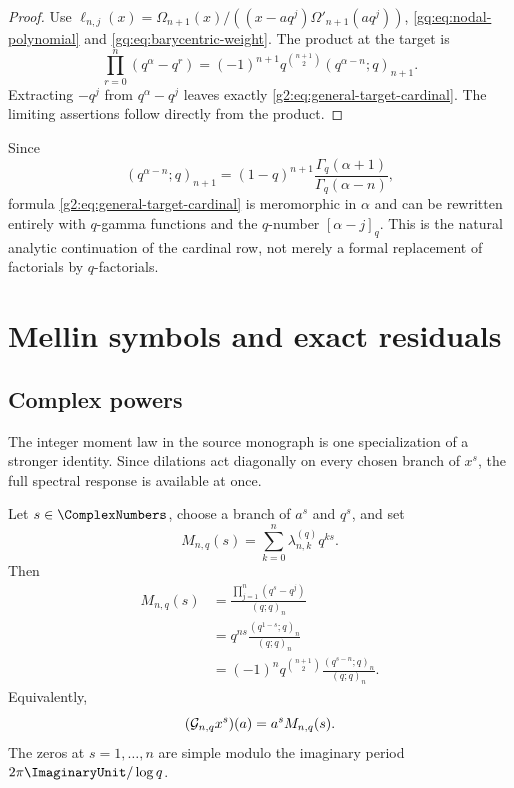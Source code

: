 \begin{proof}
Use
$\ell_{n,j}(x)=\Omega_{n+1}(x)/((x-aq^j)\Omega'_{n+1}(aq^j))$,
\eqref{gq:eq:nodal-polynomial} and \eqref{gq:eq:barycentric-weight}.  The product
at the target is
\[
 \prod_{r=0}^n(q^\alpha-q^r)
 =(-1)^{n+1}q^{\binom{n+1}{2}}(q^{\alpha-n};q)_{n+1}.
\]
Extracting $-q^j$ from $q^\alpha-q^j$ leaves exactly
\eqref{g2:eq:general-target-cardinal}.  The limiting assertions follow directly
from the product.
\end{proof}

\begin{remark}
Since
\[
 (q^{\alpha-n};q)_{n+1}
 =(1-q)^{n+1}\frac{\Gamma_q(\alpha+1)}{\Gamma_q(\alpha-n)},
\]
formula \eqref{g2:eq:general-target-cardinal} is meromorphic in $\alpha$ and can
be rewritten entirely with $q$-gamma functions and the $q$-number
$[\alpha-j]_q$.  This is the natural analytic continuation of the cardinal
row, not merely a formal replacement of factorials by $q$-factorials.
\end{remark}


\section{Mellin symbols and exact residuals}
\label{g2:sec:mellin}

\subsection{Complex powers}

The integer moment law in the source monograph is one specialization of a
stronger identity.  Since dilations act diagonally on every chosen branch of
$x^s$, the full spectral response is available at once.

\begin{theorem}
\label{g2:thm:mellin-symbol}
Let $s\in\ComplexNumbers$, choose a branch of $a^s$ and $q^s$, and set
\begin{equation}
 M_{n,q}(s)=\sum_{k=0}^n\lambda_{n,k}^{(q)}q^{ks}.
 \label{g2:eq:mellin-symbol-definition}
\end{equation}
Then
\begin{align}
 M_{n,q}(s)
 &=\frac{\prod_{j=1}^n(q^s-q^j)}{(q;q)_n}
 \label{g2:eq:mellin-product}\\
 &=q^{ns}\frac{(q^{1-s};q)_n}{(q;q)_n}
 \label{g2:eq:mellin-forward}\\
 &=(-1)^nq^{\binom{n+1}{2}}
   \frac{(q^{s-n};q)_n}{(q;q)_n}.
 \label{g2:eq:mellin-reversed}
\end{align}
Equivalently,
\begin{equation}
 (\mathcal G_{n,q}x^s)(a)=a^sM_{n,q}(s).
 \label{g2:eq:mellin-eigenvalue}
\end{equation}
The zeros at $s=1,\ldots,n$ are simple modulo the imaginary period
$2\pi\ImaginaryUnit/\log q$.
\end{theorem}

